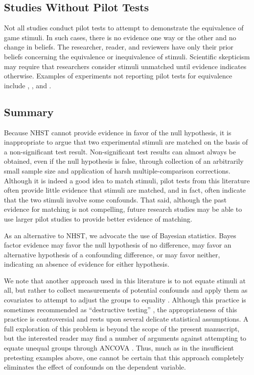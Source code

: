 \documentclass[man]{apa6}
\begin{document}
\subsection{Studies Without Pilot Tests}
Not all studies conduct pilot tests to attempt to demonstrate the equivalence of game stimuli. In such cases, there is no evidence one way or the other and no change in beliefs. The researcher, reader, and reviewers have only their prior beliefs concerning the equivalence or inequivalence of stimuli. Scientific skepticism may require that researchers consider stimuli unmatched until evidence indicates otherwise. Examples of experiments not reporting pilot tests for equivalence include \citet{Bartholow:Anderson:2002}, \citet{Bartholow:etal:2005}, and \citet{Hasan:etal:2012}. 

\subsection{Summary}
Because NHST cannot provide evidence in favor of the null hypothesis, it is inappropriate to argue that two experimental stimuli are matched on the basis of a non-significant test result.  Non-significant test results can almost always be obtained, even if the null hypothesis is false, through collection of an arbitrarily small sample size and application of harsh multiple-comparison corrections.  Although it is indeed a good idea to match stimuli, pilot tests from this literature often provide little evidence that stimuli are matched, and in fact, often indicate that the two stimuli involve some confounds. That said, although the past evidence for matching is not compelling, future research studies may be able to use larger pilot studies to provide better evidence of matching. 
 
As an alternative to NHST, we advocate the use of Bayesian statistics. Bayes factor evidence may favor the null hypothesis of no difference, may favor an alternative hypothesis of a confounding difference, or may favor neither, indicating an absence of evidence for either hypothesis. 

We note that another approach used in this literature is to not equate stimuli at all, but rather to collect measurements of potential confounds and apply them as covariates to attempt to adjust the groups to equality \citep[e.g.,][]{Bushman:Anderson:2002,Bushman:Anderson:2009,Carnagey:etal:2007,Sestir:Bartholow:2010}. Although this practice is sometimes recommended as ``destructive testing'' \citep{Anderson:Anderson:1996,Prot:Anderson:2013}, 
the appropriateness of this practice is controversial and rests upon several delicate statistical assumptions. A full exploration of this problem is beyond the scope of the present manuscript, but the interested reader may find a number of arguments against attempting to equate unequal groups through ANCOVA \citep[e.g.,][]{Miller:Chapman:2001}. 
Thus, much as in the insufficient pretesting examples above, one cannot be certain that this approach completely eliminates the effect of confounds on the dependent variable.
\end{document}
